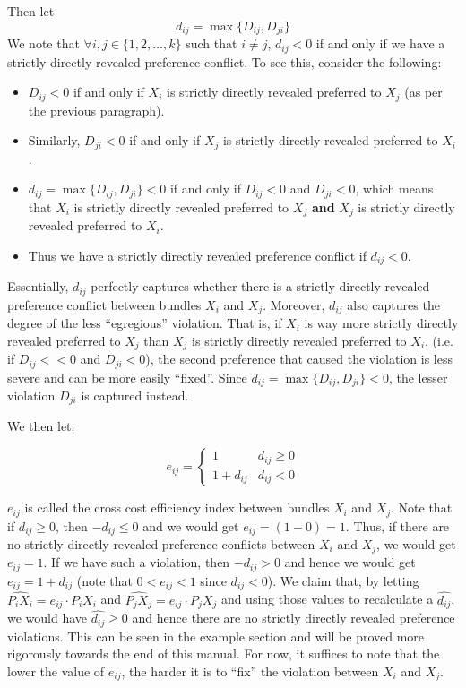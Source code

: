 \documentclass{article} %
\begin{document}
Then let
$$d_{ij}=\max\{D_{ij}, D_{ji}\}$$ 
We note that $\forall i,j\in\{1,2,\ldots,k\}$ such that $i\not=j$, $d_{ij}<0$ if and only if we have a strictly directly revealed preference conflict. To see this, consider the following:

\begin{itemize}
    \item $D_{ij}<0$ if and only if $X_{i}$ is strictly directly revealed preferred to $X_{j}$ (as per the previous paragraph). 
    \item Similarly, $D_{ji}<0$ if and only if $X_{j}$ is strictly directly revealed preferred to $X_{i}$.
    \item $d_{ij}=\max\{D_{ij}, D_{ji}\}<0$ if and only if $D_{ij}<0$ and $D_{ji}<0$, which means that $X_{i}$ is strictly directly revealed preferred to $X_{j}$ \textbf{and} $X_{j}$ is strictly directly revealed preferred to $X_{i}$. 
    \item Thus we have a strictly directly revealed preference conflict if $d_{ij} < 0$.
\end{itemize}

Essentially, $d_{ij}$ perfectly captures whether there is a strictly directly revealed preference conflict between bundles $X_{i}$ and $X_{j}$. Moreover, $d_{ij}$ also captures the degree of the less ``egregious'' violation. That is, if $X_{i}$ is way more strictly directly revealed preferred to $X_{j}$ than $X_{j}$ is strictly directly revealed preferred to $X_{i}$, (i.e. if $D_{ij}<<0$ and $D_{ji}<0$), the second preference that caused the violation is less severe and can be more easily ``fixed''. Since $d_{ij}=\max\{D_{ij}, D_{ji}\}<0$, the lesser violation $D_{ji}$ is captured instead.

We then let:

\[
e_{ij}=
\begin{cases}
1 & d_{ij}\geq0 \\
1+d_{ij} & d_{ij}<0
\end{cases}
\]

$e_{ij}$ is called the cross cost efficiency index between bundles $X_{i}$ and $X_{j}$. Note that if $d_{ij}\geq0$, then $-d_{ij}\leq0$ and we would get $e_{ij}=(1-0)=1$. Thus, if there are no strictly directly revealed preference conflicts between $X_{i}$ and $X_{j}$, we would get $e_{ij}=1$. If we have such a violation, then $-d_{ij}>0$ and hence we would get $e_{ij}=1+d_{ij}$ (note that $0<e_{ij}<1$ since $d_{ij}<0$). We claim that, by letting $\hat{ P_iX_i}=e_{ij}\cdot P_iX_i$ and $\hat{P_jX_j}=e_{ij}\cdot P_jX_j$ and using those values to recalculate a $\hat{d_{ij}}$, we would have $\hat{d_{ij}}\geq0$ and hence there are no strictly directly revealed preference violations. This can be seen in the example section and will be proved more rigorously towards the end of this manual. For now, it suffices to note that the lower the value of $e_{ij}$, the harder it is to ``fix'' the violation between $X_{i}$ and $X_{j}$.
\end{document}
